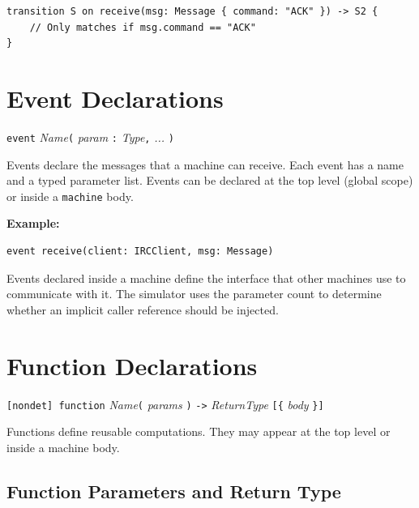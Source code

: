 \documentclass[11pt,letterpaper]{article}
\begin{document}
\begin{lstlisting}[numbers=none]
transition S on receive(msg: Message { command: "ACK" }) -> S2 {
    // Only matches if msg.command == "ACK"
}
\end{lstlisting}


\section{Event Declarations}
\label{sec:events}

\begin{syntaxbox}[event]
\texttt{event} \textit{Name}\texttt{(} \textit{param} \texttt{:} \textit{Type}\texttt{,} \textit{...} \texttt{)}
\end{syntaxbox}

Events declare the messages that a machine can receive.  Each event has a
name and a typed parameter list.  Events can be declared at the top level
(global scope) or inside a \lstinline{machine} body.

\textbf{Example:}
\begin{lstlisting}[numbers=none]
event receive(client: IRCClient, msg: Message)
\end{lstlisting}

Events declared inside a machine define the interface that other machines
use to communicate with it.  The simulator uses the parameter count to
determine whether an implicit caller reference should be injected.


\section{Function Declarations}
\label{sec:functions}

\begin{syntaxbox}[function]
\texttt{[nondet] function} \textit{Name}\texttt{(} \textit{params} \texttt{)} \texttt{->} \textit{ReturnType}
  \texttt{[\{} \textit{body} \texttt{\}]}
\end{syntaxbox}

Functions define reusable computations.  They may appear at the top level
or inside a machine body.

\subsection{Function Parameters and Return Type}
\end{document}

